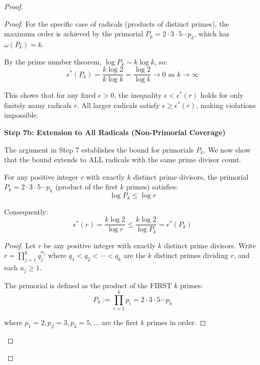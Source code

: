 \begin{proof}
\begin{proof}
For the specific case of radicals (products of distinct primes), the maximum order is achieved by the primorial $P_k = 2 \cdot 3 \cdot 5 \cdots p_k$, which has $\omega(P_k) = k$.

By the prime number theorem, $\log P_k \sim k \log k$, so:
\begin{equation}
\epsilon^*(P_k) = \frac{k \log 2}{k \log k} = \frac{\log 2}{\log k} \to 0 \text{ as } k \to \infty
\end{equation}

This shows that for any fixed $\epsilon > 0$, the inequality $\epsilon < \epsilon^*(r)$ holds for only finitely many radicals $r$. All larger radicals satisfy $\epsilon \geq \epsilon^*(r)$, making violations impossible.

\noindent \textbf{Step 7b: Extension to All Radicals (Non-Primorial Coverage)}

The argument in Step 7 establishes the bound for primorials $P_k$. We now show that the bound extends to ALL radicals with the same prime divisor count.

\begin{lemma}
\label{lem:primorial-dominance}
For any positive integer $r$ with exactly $k$ distinct prime divisors, the primorial $P_k = 2 \cdot 3 \cdot 5 \cdots p_k$ (product of the first $k$ primes) satisfies:
\begin{equation}
\log P_k \leq \log r
\end{equation}

Consequently:
\begin{equation}
\epsilon^*(r) = \frac{k \log 2}{\log r} \leq \frac{k \log 2}{\log P_k} = \epsilon^*(P_k)
\end{equation}

\end{lemma}

\begin{proof}

Let $r$ be any positive integer with exactly $k$ distinct prime divisors. Write $r = \prod_{j=1}^{k} q_j^{a_j}$ where $q_1 < q_2 < \cdots < q_k$ are the $k$ distinct primes dividing $r$, and each $a_j \geq 1$.

The primorial is defined as the product of the FIRST $k$ primes:
\begin{equation}
P_k := \prod_{i=1}^{k} p_i = 2 \cdot 3 \cdot 5 \cdots p_k
\end{equation}

where $p_1 = 2, p_2 = 3, p_3 = 5, \ldots$ are the first $k$ primes in order.


\end{proof}
\end{proof}
\end{proof}
